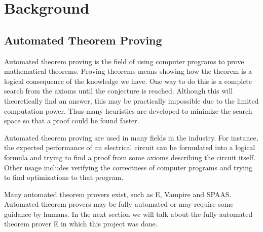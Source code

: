 \chapter{Background}\label{chap:background}

\section{Automated Theorem Proving}
Automated theorem proving is the field of using computer programs to prove mathematical theorems. Proving theorems means showing how the theorem is a logical consequence of the knowledge we have. One way to do this is a complete search from the axioms until the conjecture is reached. Although this will theoretically find an answer, this may be practically impossible due to the limited computation power. Thus many heuristics are developed to minimize the search space so that a proof could be found faster.

Automated theorem proving are used in many fields in the industry. For instance, the expected performance of an electrical circuit can be formulated into a logical formula and trying to find a proof from some axioms describing the circuit itself. Other usage includes verifying the correctness of computer programs and trying to find optimizations to that program.

Many automated theorem provers exist, such as E, Vampire and SPAAS. Automated theorem provers may be fully automated or may require some guidance by humans. In the next section we will talk about the fully automated theorem prover E in which this project was done.


